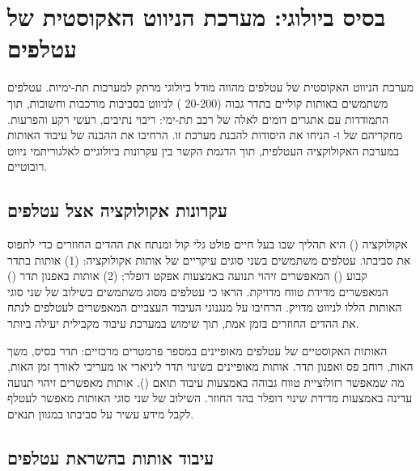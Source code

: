 
\section{בסיס ביולוגי: מערכת הניווט האקוסטית של עטלפים}
\label{sec:bio_basis}

מערכת הניווט האקוסטית של עטלפים מהווה מודל ביולוגי מרתק למערכות  תת-ימיות. עטלפים משתמשים באותות קוליים בתדר גבוה (20-200 ) לניווט בסביבות מורכבות וחשוכות, תוך התמודדות עם אתגרים דומים לאלה של רכב תת-ימי: ריבוי נתיבים, רעשי רקע והפרעות. מחקריהם של \citet{GriffinBatEcholocation} ו-\citet{Simmons1979BatSonar} הניחו את היסודות להבנת מערכת זו. \citet{GriffithBatEcholocation} הרחיבו את ההבנה של עיבוד האותות במערכת האקולוקציה העטלפית, תוך הדגמת הקשר בין עקרונות ביולוגיים לאלגוריתמי ניווט רובוטיים.

\subsection{עקרונות אקולוקציה אצל עטלפים}
\label{sec:echolocation_principles}

אקולוקציה () היא תהליך שבו בעל חיים פולט גלי קול ומנתח את ההדים החוזרים כדי לתפוס את סביבתו. עטלפים משתמשים בשני סוגים עיקריים של אותות אקולוקציה: (1) אותות בתדר קבוע () המאפשרים זיהוי תנועה באמצעות אפקט דופלר; (2) אותות באפנון תדר () המאפשרים מדידת טווח מדויקת. \citet{Schnitzler1968DSC} הראו כי עטלפים מסוג  משתמשים בשילוב של שני סוגי האותות הללו לניווט מדויק. \citet{MossEcholocation} הרחיבו על מנגנוני העיבוד העצביים המאפשרים לעטלפים לנתח את ההדים החוזרים בזמן אמת, תוך שימוש במערכת עיבוד מקבילית יעילה ביותר.

האותות האקוסטיים של עטלפים מאופיינים במספר פרמטרים מרכזיים: תדר בסיס, משך האות, רוחב פס ואפנון תדר. אותות  מאופיינים בשינוי תדר ליניארי או מעריכי לאורך זמן האות, מה שמאפשר רזולוציית טווח גבוהה באמצעות עיבוד תואם (). אותות  מאפשרים זיהוי תנועה עדינה באמצעות מדידת שינוי דופלר בהד החוזר. השילוב של שני סוגי האותות מאפשר לעטלף לקבל מידע עשיר על סביבתו במגוון תנאים.

\subsection{עיבוד אותות בהשראת עטלפים}
\label{sec:bat_inspired_processing}

